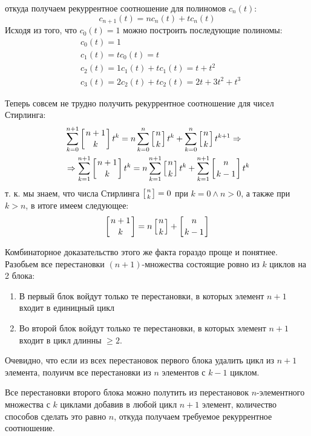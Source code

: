 откуда получаем рекуррентное соотношение для полиномов $c_n\left(t\right)$:
\[
	c_{n+1}\left(t\right) = n c_n\left(t\right) + t c_n\left(t\right)
\]
Исходя из того, что $c_0\left(t\right) = 1$ можно построить последующие полиномы:
\[
	\begin{split}
		& c_0\left(t\right) = 1\\
		& c_1\left(t\right) = t c_0\left(t\right) = t\\
		& c_2\left(t\right) = 1 c_1\left(t\right) + t c_1\left(t\right) = t + t^2\\
		& c_3\left(t\right) = 2 c_2\left(t\right) + t c_2\left(t\right) = 2 t + 3 t^2 + t^3
	\end{split}
\]

Теперь совсем не трудно получить рекуррентное соотношение для чисел Стирлинга:
\[
	\begin{split}
		& \sum_{k=0}^{n+1} \left[n+1 \atop k\right] t^k = n \sum_{k=0}^n \left[n\atop k\right] t^k + \sum_{k=0}^n \left[n\atop k\right] t^{k+1} \Rightarrow\\
		& \Rightarrow \sum_{k=1}^{n+1} \left[n+1 \atop k\right] t^k = n \sum_{k=1}^{n+1} \left[n \atop k\right] t^k + \sum_{k=1}^{n+1} \left[n \atop k-1\right] t^k
	\end{split}
\]
т. к. мы знаем, что числа Стирлинга $\left[n \atop k\right] = 0$ при $k = 0 \land n > 0$, а также при $k > n$, в итоге имеем следующее:
\[
	\left[n+1 \atop k\right] = n \left[n \atop k\right] + \left[n \atop k-1\right]
\]

Комбинаторное доказательство этого же факта гораздо проще и понятнее. Разобьем все перестановки $\left(n+1\right)$-множества состоящие ровно из $k$ циклов на 2 блока:
\begin{enumerate}
\item В первый блок войдут только те перестановки, в которых элемент $n+1$ входит в единицный цикл

\item Во второй блок войдут только те перестановки, в которых элемент $n+1$ входит в цикл длинны $\ge 2$.
\end{enumerate}

Очевидно, что если из всех перестановок первого блока удалить цикл из $n+1$ элемента, полуичм все перестановки из $n$ элементов с $k-1$ циклом.

Все перестановки второго блока можно полутить из перестановок $n$-элементного множества с $k$ циклами добавив в любой цикл $n+1$ элемент, количество способов сделать это равно $n$, откуда получаем требуемое рекуррентное соотношение.

